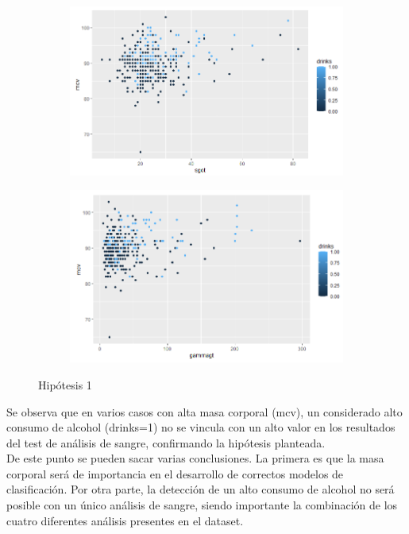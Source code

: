 \begin{figure}[!tbh]
	\begin{subfigure}{0.5\textwidth}
	\includegraphics[width=1\linewidth]{figures/tesis_3}
\caption{}
\label{fig:tesis3}
	\end{subfigure}\hfil %
	\begin{subfigure}{0.5\textwidth}
	\includegraphics[width=1\linewidth]{figures/tesis_4}
\caption{}
\label{fig:tesis4}
	\end{subfigure}\hfil %
	
	\caption{Hipótesis 1}
	\label{hipo1}
\end{figure}




Se observa que en varios casos con alta masa corporal (mcv), un considerado alto consumo de alcohol (drinks=1) no se vincula con un alto valor en los resultados del test de análisis de sangre, confirmando la hipótesis planteada.\\

 De este punto se pueden sacar varias conclusiones. La primera es que la masa corporal será de importancia en el desarrollo de correctos modelos de clasificación. Por otra parte, la detección de un alto consumo de alcohol no será posible con un único análisis de sangre, siendo importante la combinación de los cuatro diferentes análisis presentes en el dataset. 
	
